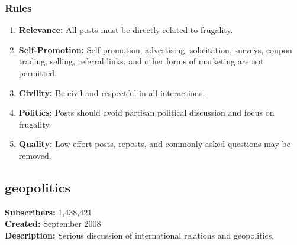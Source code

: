 \subsubsection{Rules}
\begin{enumerate}
    \item \textbf{Relevance:} All posts must be directly related to frugality.
    
    \item \textbf{Self-Promotion:} Self-promotion, advertising, solicitation, surveys, coupon trading, selling, referral links, and other forms of marketing are not permitted.
    
    \item \textbf{Civility:} Be civil and respectful in all interactions.
    
    \item \textbf{Politics:} Posts should avoid partisan political discussion and focus on frugality.
    
    \item \textbf{Quality:} Low-effort posts, reposts, and commonly asked questions may be removed.
\end{enumerate}

\subsection{geopolitics}
\textbf{Subscribers:} 1,438,421 \\
\textbf{Created:} September 2008 \\
\textbf{Description:} Serious discussion of international relations and geopolitics.

